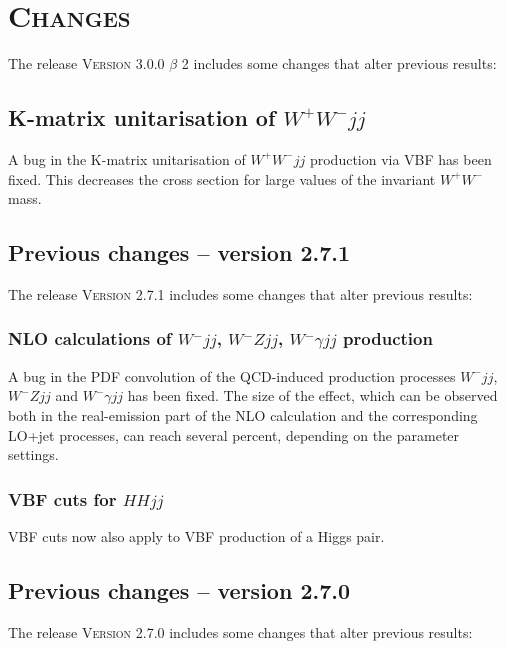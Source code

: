 \documentclass[english,12pt]{article}
\begin{document}
\newpage

\section{\textsc{Changes}}

The release \textsc{Version 3.0.0 $\beta$ 2} includes some changes that alter previous results:

\subsection{K-matrix unitarisation of $W^+W^-jj$}

A bug in the K-matrix unitarisation of $W^+W^-jj$ production via VBF has been
fixed. This decreases the cross section for large values of the invariant
$W^+W^-$ mass.


\subsection{Previous changes -- version 2.7.1}

The release \textsc{Version 2.7.1} includes some changes that alter previous results:


\subsubsection{NLO calculations of $W^-jj$, $W^-Zjj$, $W^-\gamma jj$ production}

A bug in the PDF convolution of the QCD-induced production processes $W^-jj$,
$W^-Zjj$ and $W^-\gamma jj$ has been fixed. The size of the effect,
which can be observed both in the real-emission part of the NLO
calculation and the corresponding LO+jet processes, can reach several
percent, depending on the parameter settings.


\subsubsection{VBF cuts for $HHjj$}

VBF cuts now also apply to VBF production of a Higgs pair.


\subsection{Previous changes -- version 2.7.0}

The release \textsc{Version 2.7.0} includes some changes that alter previous results:
\end{document}
